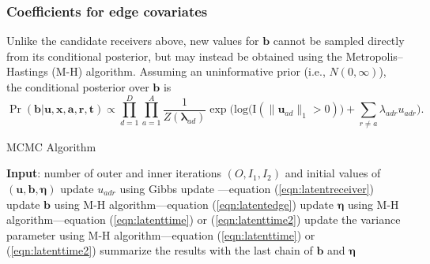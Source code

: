 \documentclass[ba]{imsart}
\def\spacingset#1{\renewcommand{\baselinestretch}%
	{#1}\small\normalsize} \spacingset{1}
\numberwithin{equation}{section}
\theoremstyle{plain}
\begin{document}
	\subsubsection{Coefficients for edge covariates}
	Unlike the candidate receivers above, new values for $\boldsymbol{b}$ cannot be sampled directly from its conditional posterior, but may instead be obtained using the Metropolis--Hastings (M-H) algorithm. Assuming an uninformative prior (i.e., $N({0},\infty)$), the conditional posterior over $\boldsymbol{b}$ is
	\begin{equation}
		\Pr(\boldsymbol{b}| \boldsymbol{u}, \boldsymbol{x}, \boldsymbol{a}, \boldsymbol{r},\boldsymbol{t})\propto \prod_{d=1}^D
		\prod_{a=1}^A \frac{1}{Z(\boldsymbol{\lambda}_{ad})}\exp\Big(\mbox{log}\big(\text{I}( \lVert \boldsymbol{u}_{ad}\rVert_1 > 0)\big) + \sum\limits_{r \neq a} \lambda_{adr}u_{adr}\Big).
		\label{eqn:latentedge}
	\end{equation}
	\begin{algorithm}[!t]
		\spacingset{1}
		\SetAlgoLined
		\caption{MCMC Algorithm}
		\begin{algorithmic}
			\STATE \textbf{Input}: number of outer and inner iterations $(O, I_1, I_2)$ and initial values of $(\boldsymbol{u}, \boldsymbol{b}, \boldsymbol{\eta})$
			\vskip 0.1in
			\STATE update $u_{adr}$ using Gibbs update ---equation (\ref{eqn:latentreceiver})
			\ENDFOR
			\ENDFOR
			\ENDFOR
			\STATE update $\boldsymbol{b}$ using M-H algorithm---equation (\ref{eqn:latentedge})
			\ENDFOR
			\STATE update $\boldsymbol{\eta}$ using M-H algorithm---equation (\ref{eqn:latenttime}) or (\ref{eqn:latenttime2}) 
			\ENDFOR
			\STATE update the variance parameter using M-H algorithm---equation (\ref{eqn:latenttime}) or (\ref{eqn:latenttime2}) 
			\ENDIF
			\ENDFOR
			\STATE	summarize the results with the last chain of $\boldsymbol{b}$ and $\boldsymbol{\eta}$
		\end{algorithmic}
		\label{alg:MCMC}
	\end{algorithm}
\end{document}
